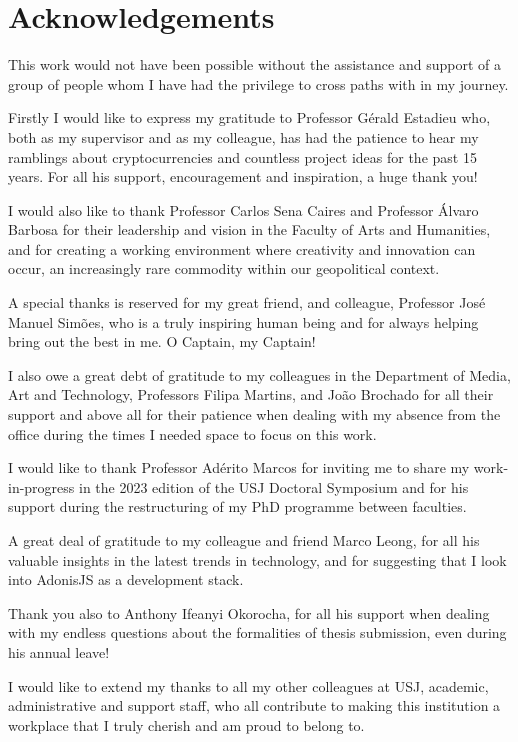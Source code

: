 \chapter*{Acknowledgements}

This work would not have been possible without the assistance and support of a group of people whom I have had the privilege to cross paths with in my journey.

Firstly I would like to express my gratitude to Professor Gérald Estadieu who, both as my supervisor and as my colleague, has had the patience to hear my ramblings about cryptocurrencies and countless project ideas for the past 15 years. For all his support, encouragement and inspiration, a huge thank you!

I would also like to thank Professor Carlos Sena Caires and Professor Álvaro Barbosa for their leadership and vision in the Faculty of Arts and Humanities, and for creating a working environment where creativity and innovation can occur, an increasingly rare commodity within our geopolitical context.

A special thanks is reserved for my great friend, and colleague, Professor José Manuel Simões, who is a truly inspiring human being and for always helping bring out the best in me. O Captain, my Captain!

I also owe a great debt of gratitude to my colleagues in the Department of Media, Art and Technology, Professors Filipa Martins, and João Brochado for all their support and above all for their patience when dealing with my absence from the office during the times I needed space to focus on this work.

I would like to thank Professor Adérito Marcos for inviting me to share my work-in-progress in the 2023 edition of the USJ Doctoral Symposium and for his support during the restructuring of my PhD programme between faculties.

A great deal of gratitude to my colleague and friend Marco Leong, for all his valuable insights in the latest trends in technology, and for suggesting that I look into AdonisJS as a development stack.

Thank you also to Anthony Ifeanyi Okorocha, for all his support when dealing with my endless questions about the formalities of thesis submission, even during his annual leave!

I would like to extend my thanks to all my other colleagues at USJ, academic, administrative and support staff, who all contribute to making this institution a workplace that I truly cherish and am proud to belong to. 

